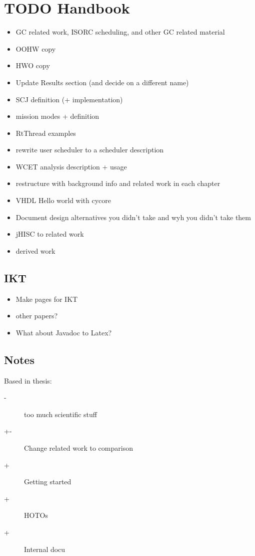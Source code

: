 \section{TODO Handbook}

\begin{itemize}
    \item GC related work, ISORC scheduling, and other GC related
    material
    \item OOHW copy
    \item HWO copy
    \item Update Results section (and decide on a different name)
    \item SCJ definition (+ implementation)
    \item mission modes + definition
    \item RtThread examples
    \item rewrite user scheduler to a scheduler description
    \item WCET analysis description + usage
    \item restructure with background info and related work in each
    chapter
    \item VHDL Hello world with cycore
    \item Document design alternatives you didn't take and wyh you
    didn't take them
    \item jHISC to related work
    \item derived work
\end{itemize}

\subsection{IKT}

\begin{itemize}
    \item Make pages for IKT
    \item other papers?
    \item What about Javadoc to Latex?
\end{itemize}
\subsection{Notes}

Based in thesis:
\begin{description}
    \item[-] too much scientific stuff
    \item[+-] Change related work to comparison
    \item[+] Getting started
    \item[+] HOTOs
    \item[+] Internal docu
\end{description}


